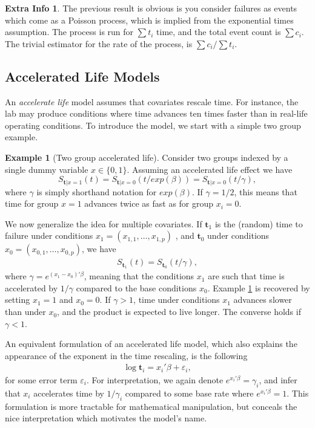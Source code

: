 \documentclass[12pt,a4paper]{report}
\theoremstyle{plain}
\theoremstyle{definition}
\newtheorem{extra}{Extra Info}
\newtheorem{example}{Example}
\newcommand{\set}[1]{\{ #1 \}} \newcommand{\setII}[1]{\left\{ #1 \right\}} \newcommand{\rv}[1]{\mathbf{#1}} \newcommand{\x}{\rv x} \newcommand{\y}{\rv y} \newcommand{\U}{\rv u} \newcommand{\T}{\rv t} \newcommand{\X}{\rv X} \newcommand{\Y}{\rv Y} \newcommand{\expect}[1]{\mathbf{E}\left[ #1 \right]} \newcommand{\expectg}[2]{\mathbf{E}_{\rv{#1}}\left[ \rv{#2} \right]} \newcommand{\expectn}[1]{\mathbb{E}\left[#1\right]} \newcommand{\cov}[1]{\mathbf{Cov} \left[ #1 \right]} \newcommand{\var}[1]{\mathop{Var} \left[ #1 \right]} \newcommand{\covn}[1]{\mathbb{Cov} \left[ #1 \right]} \newcommand{\gauss}[1]{\mathcal{N}\left(#1\right)} \newcommand{\cdf}[2]{F_{#1} (#2)} \newcommand{\survive}[2]{S_{#1} (#2)} \newcommand{\hazard}[2]{h_{#1} (#2)} \newcommand{\cuhazard}[2]{H_{#1} (#2)} \newcommand{\cdfn}[2]{\mathbb{F}_{#1}(#2)} \newcommand{\icdf}[2]{F_\rv{#1}^{-1} (#2)} \newcommand{\icdfn}[2]{\mathbb{F}^{-1}_{#1}(#2)} \newcommand{\pdf}[2]{p_{#1} (#2)} \newcommand{\prob}[1]{P\left( #1 \right)} \newcommand{\dist}{P} \newcommand{\density}{p}
\begin{document}
\begin{extra}
The previous result is obvious is you consider failures as events which come as a Poisson process, which is implied from the exponential times assumption. 
The process is run for $\sum t_i$ time, and the total event count is $\sum c_i$. 
The trivial estimator for the rate of the process, is $\sum c_i/\sum t_i$.
\end{extra}






\subsection{Accelerated Life Models}
An \emph{accelerate life} model assumes that covariates rescale time. 
For instance, the lab may produce conditions where time advances ten times faster than in real-life operating conditions.
To introduce the model, we start with a simple two group example.
\begin{example}[Two group accelerated life]
\label{eg:two_group_accelerated_life}
Consider two groups indexed by a single dummy variable $x \in \set{0,1}$.
Assuming an accelerated life effect we have
$$
	\survive{\T|x=1}{t} = \survive{\T|x = 0}{t/exp(\beta)} = \survive{\T|x = 0}{t/\gamma}, 
$$
where $\gamma$ is simply shorthand notation for $exp(\beta)$. 
If $\gamma=1/2$, this means that time for group $x=1$ advances twice as fast as for group $x_i=0$.
\end{example}

We now generalize the idea for multiple covariates.
If $\T_1$ is the (random) time to failure under conditions $x_1=(x_{1,1},\dots,x_{1,p})$ , and $\T_0$ under conditions $x_0=(x_{0,1},\dots,x_{0,p})$, we have
\begin{align}
\label{eq:accelerated_life}
	\survive{\T_1}{t}=\survive{\T_0}{t/\gamma},
\end{align}
where $\gamma= e^{(x_1-x_0)' \beta}$, meaning that the conditions $x_1$ are such that time is accelerated by $1/\gamma$ compared to the base conditions $x_0$.
Example \ref{eg:two_group_accelerated_life} is recovered by setting $x_1=1$ and $x_0=0$. 
If $\gamma>1$, time under conditions $x_1$ advances slower than under $x_0$, and the product is expected to live longer. 
The converse holds if $\gamma<1$.


An equivalent formulation of an accelerated life model, which also explains the appearance of the exponent in the time rescaling, is the following 
\begin{align}
\label{eq:estimating_accelerated_life}
	\log \T_i = x_i'\beta + \varepsilon_i,
\end{align}
for some error term $\varepsilon_i$. 
For interpretation, we again denote $e^{x_i'\beta}= \gamma_i$, and infer that $x_i$ accelerates time by $1/\gamma_i$ compared to some base rate where $e^{x_i'\beta}= 1$.
This formulation is more tractable for mathematical manipulation, but conceals the nice interpretation which motivates the model's name.
\end{document}
